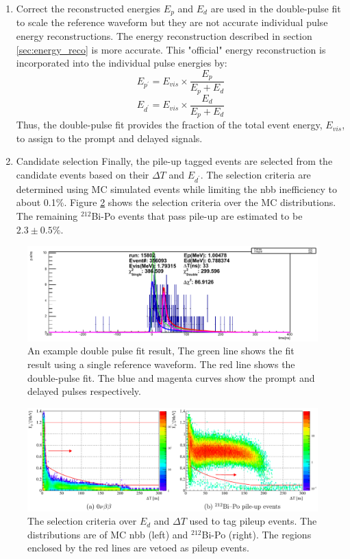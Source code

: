 \begin{enumerate}
	\item Correct the reconstructed energies
	$E_p$ and $E_d$ are used in the double-pulse fit to scale the reference waveform but they are not accurate individual pulse energy reconstructions. The energy reconstruction described in section \ref{sec:energy_reco} is more accurate. This "official" energy reconstruction is incorporated into the individual pulse energies by:
	\begin{equation}
		E_{p^\prime}=E_{vis}\times\frac{E_p}{E_p+E_d}
	\end{equation}
	\begin{equation}
		E_{d^\prime}=E_{vis}\times\frac{E_d}{E_p+E_d}
	\end{equation}
	Thus, the double-pulse fit provides the fraction of the total event energy, $E_{vis}$, to assign to the prompt and delayed signals.
	\item Candidate selection
	Finally, the pile-up tagged events are selected from the candidate events based on their $\Delta T$ and $E_{d^\prime}$. The selection criteria are determined using MC simulated events while limiting the \0nbb inefficiency to about 0.1\%. Figure \ref{fig:pileup_selection} shows the selection criteria over the MC distributions. The remaining $^{212}$Bi-Po events that pass pile-up are estimated to be $2.3\pm0.5\%$.
\end{enumerate}
\begin{figure}[htb]
	\centering
	\includegraphics[scale=0.5]{highE_example_doublepulse.png}
	\caption{An example double pulse fit result, The green line shows the fit result using a single reference waveform. The red line shows the double-pulse fit. The blue and magenta curves show the prompt and delayed pulses respectively.}
	\label{fig:dpfit}
\end{figure}
\begin{figure}[htb]
	\centering
	\includegraphics[scale=0.35]{dp_selection.png}
	\caption{The selection criteria over $E_d$ and $\Delta T$ used to tag pileup events. The distributions are of MC \0nbb (left) and $^{212}$Bi-Po (right). The regions enclosed by the red lines are vetoed as pileup events.}
	\label{fig:pileup_selection}
\end{figure}
